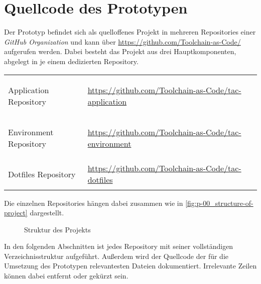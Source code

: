 \chapter{Quellcode des Prototypen}
\label{ch:BB_source-code-of-prototype}

Der Prototyp befindet sich als quelloffenes Projekt in mehreren Repositories einer \textit{GitHub Organization} und kann über \url{https://github.com/Toolchain-as-Code/} aufgerufen werden. Dabei besteht das Projekt aus drei Hauptkomponenten, abgelegt in je einem dedizierten Repository.

\begin{table}[H]
    \centering
    \begin{tabular}{ >{\bfseries\raggedright}p{} >{}p{} }
        Application Repository &
        \url{https://github.com/Toolchain-as-Code/tac-application} \\
        Environment Repository &
        \url{https://github.com/Toolchain-as-Code/tac-environment} \\
        Dotfiles Repository &
        \url{https://github.com/Toolchain-as-Code/tac-dotfiles} \\
    \end{tabular}
\end{table}

Die einzelnen Repositories hängen dabei zusammen wie in \autoref{fig:p-00_structure-of-project} dargestellt.

\begin{figure}[H]
    \caption{Struktur des Projekts}
    \label{fig:p-00_structure-of-project}
\end{figure}

In den folgenden Abschnitten ist jedes Repository mit seiner vollständigen Verzeichnisstruktur aufgeführt. Außerdem wird der Quellcode der für die Umsetzung des Prototypen relevantesten Dateien dokumentiert. Irrelevante Zeilen können dabei entfernt oder gekürzt sein.

     \clearpage
     \clearpage
        \clearpage
